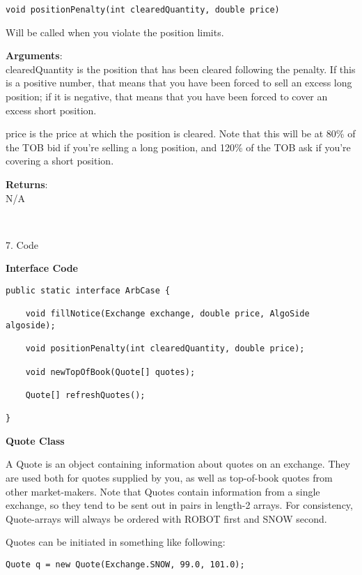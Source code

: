 \documentclass[12pt]{article}
\begin{document}
\begin{framed}
\begin{verbatim}void positionPenalty(int clearedQuantity, double price)\end{verbatim}
Will be called when you violate the position limits. 

\textbf{Arguments}: \\
clearedQuantity is the position that has been cleared following the penalty. If this is a positive number, that means that you have been forced to sell an excess long position; if it is negative, that means that you have been forced to cover an excess short position.

price is the price at which the position is cleared. Note that this will be at 80\% of the TOB bid if you’re selling a long position, and 120\% of the TOB ask if you’re covering a short position.

\textbf{Returns}: \\
N/A
\end{framed}


\ \\
\begin{center}7. Code\end{center}
\textbf{Interface Code}
\begin{framed}
\begin{verbatim}
public static interface ArbCase {
	
    void fillNotice(Exchange exchange, double price, AlgoSide algoside);
	
    void positionPenalty(int clearedQuantity, double price);
	
    void newTopOfBook(Quote[] quotes);
	
    Quote[] refreshQuotes();
	
}
\end{verbatim}
\end{framed}

\textbf{Quote Class}
\begin{framed}
A Quote is an object containing information about quotes on an exchange. They are used both for quotes supplied by you, as well as top-of-book quotes from other market-makers. Note that Quotes contain information from a single exchange, so they tend to be sent out in pairs in length-2 arrays. For consistency, Quote-arrays will always be ordered with ROBOT first and SNOW second.

Quotes can be initiated in something like following:
\begin{verbatim}Quote q = new Quote(Exchange.SNOW, 99.0, 101.0);\end{verbatim}

\end{framed}
\end{document}
